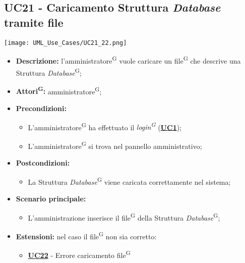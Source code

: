\subsection{UC21 - Caricamento Struttura \textit{Database} tramite file}
\label{sec:UC21}
\texttt{[image: UML\_Use\_Cases/UC21\_22.png]}
\begin{itemize}
	\item \textbf{Descrizione:} l’amministratore\textsuperscript{G} vuole caricare un file\textsuperscript{G} che descrive una Struttura \textit{Database}\textsuperscript{G};
	\item \textbf{Attori\textsuperscript{G}:} amministratore\textsuperscript{G};
	\item \textbf{Precondizioni:} 
	\begin{itemize}
		\item L’amministratore\textsuperscript{G} ha effettuato il \textit{login\textsuperscript{G}} (\hyperref[sec:UC1]{\textbf{UC1}});
		\item L’amministratore\textsuperscript{G} si trova nel pannello amministrativo;
	\end{itemize}
	\item \textbf{Postcondizioni:} 
	\begin{itemize}
		\item La Struttura \textit{Database}\textsuperscript{G} viene caricata correttamente nel sistema;
	\end{itemize}
	\item \textbf{Scenario principale:} 
	\begin{itemize}
		\item L'amministrazione inserisce il file\textsuperscript{G} della Struttura \textit{Database}\textsuperscript{G};
	\end{itemize}
	\item \textbf{Estensioni:} nel caso il file\textsuperscript{G} non sia corretto:
	\begin{itemize}
		\item \hyperref[sec:UC22]{\textbf{UC22}} - Errore caricamento file\textsuperscript{G}
	\end{itemize}
\end{itemize}

